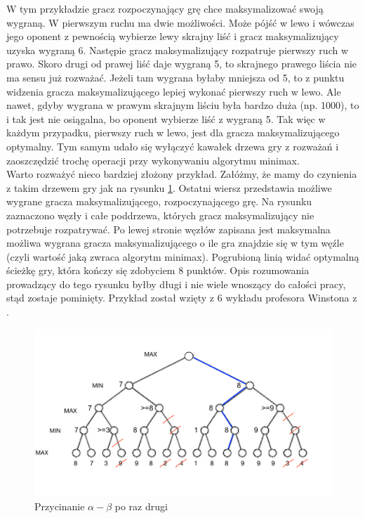 \documentclass[licencjacka]{pracamgr}
\begin{document}
W tym przykładzie gracz rozpoczynający grę chce maksymalizować swoją wygraną. W pierwszym ruchu ma dwie możliwości. Może pójść w lewo i wówczas jego oponent z pewnością wybierze lewy skrajny liść i gracz maksymalizujący uzyska wygraną 6. Następie gracz maksymalizujący rozpatruje pierwszy ruch w prawo. Skoro drugi od prawej liść daje wygraną 5, to skrajnego prawego liścia nie ma sensu już rozważać. Jeżeli tam wygrana byłaby mniejsza od 5, to z punktu widzenia gracza maksymalizującego lepiej wykonać pierwszy ruch w lewo. Ale nawet, gdyby wygrana w prawym skrajnym liściu była bardzo duża (np. 1000), to i tak jest nie osiągalna, bo oponent wybierze liść z wygraną 5. Tak więc w każdym przypadku, pierwszy ruch w lewo, jest dla gracza maksymalizującego optymalny. Tym samym udało się wyłączyć kawałek drzewa gry z rozważań i zaoszczędzić trochę  operacji przy wykonywaniu algorytmu minimax. \\

Warto rozważyć nieco bardziej złożony przykład. Załóżmy, że mamy do czynienia z takim drzewem gry jak na rysunku \ref{Rys4}. Ostatni wiersz przedstawia możliwe wygrane gracza maksymalizującego, rozpoczynającego grę. Na rysunku zaznaczono węzły i całe poddrzewa, których gracz maksymalizujący nie potrzebuje rozpatrywać. Po lewej stronie węzłów zapisana jest maksymalna możliwa wygrana gracza maksymalizującego o ile gra znajdzie się w tym węźle (czyli wartość jaką zwraca algorytm minimax). Pogrubioną linią widać optymalną ścieżkę gry, która kończy się zdobyciem 8 punktów. Opis rozumowania prowadzący do tego rysunku byłby długi i nie wiele wnoszący do całości pracy, stąd zostaje pominięty. Przykład został wzięty z 6 wykładu profesora Winstona z \cite{MIT_AI}.\\

\begin{figure}[h!]
	\includegraphics [scale=0.4] {big_tree2.png}
	\caption{Przycinanie $\alpha - \beta$ po raz drugi}
	\label{Rys4}
\end{figure}
\end{document}
